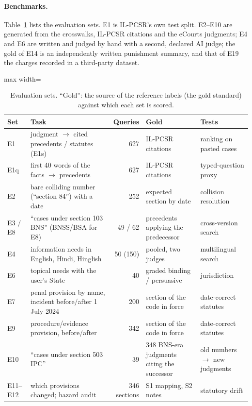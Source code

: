 \documentclass[sigconf,nonacm]{acmart}
\begin{document}
\paragraph{Benchmarks.} Table~\ref{tab:benchmarks} lists the evaluation sets. E1 is IL-PCSR's own
test split. E2--E10 are generated from the crosswalks, IL-PCSR citations and the eCourts
judgments; E4 and E6 are written and judged by hand with a second, declared AI judge; the gold of E14 is an
independently written punishment summary, and that of E19 the charges recorded in a third-party
dataset.

\begin{table}[t]
\centering\small
\caption{Evaluation sets. ``Gold'': the source of the reference labels (the gold standard)
against which each set is scored.}
\label{tab:benchmarks}
\begin{adjustbox}{max width=\linewidth}
\begin{tabular}{llrll}
\toprule
Set & Task & Queries & Gold & Tests \\
\midrule
E1 & judgment $\to$ cited precedents / statutes (E1s) & 627 & IL-PCSR citations & ranking on pasted cases \\
E1q & first 40 words of the facts $\to$ precedents & 627 & IL-PCSR citations & typed-question proxy \\
E2 & bare colliding number (``section 84'') with a date & 252 & expected section by date & collision resolution \\
E3 / E8 & ``cases under section 103 BNS'' (BNSS/BSA for E8) & 49 / 62 & precedents applying the predecessor & cross-version search \\
E4 & information needs in English, Hindi, Hinglish & 50 (150) & pooled, two judges & multilingual search \\
E6 & topical needs with the user's State & 40 & graded binding / persuasive & jurisdiction \\
E7 & penal provision by name, incident before/after 1 July 2024 & 200 & section of the code in force & date-correct statutes \\
E9 & procedure/evidence provision, before/after & 342 & section of the code in force & date-correct statutes \\
E10 & ``cases under section 503 IPC'' & 39 & 348 BNS-era judgments citing the successor & old numbers $\to$ new judgments \\
E11--E12 & which provisions changed; hazard audit & 346 sections & S1 mapping, S2 notes & statutory drift \\

\end{tabular}
\end{adjustbox}
\end{table}
\end{document}
